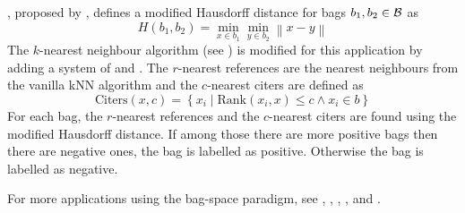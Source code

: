 , proposed by \cite{wang_solving_2000}, defines a modified Hausdorff distance for bags \( b_1, b_2 \in \mathcal{B} \) as
\[ H \left( b_1, b_2 \right) = \min_{x \in b_1} \min_{y \in b_2} \left\lVert x - y \right\rVert \]
The \( k \)-nearest neighbour algorithm (see \cite{dasarathy_nearest_1991}) is modified for this application by adding a system of  and . The \( r \)-nearest references are the nearest neighbours from the vanilla kNN algorithm and the \( c \)-nearest citers are defined as
\[ \mathrm{Citers} \left( x, c \right) = \left\{ x_i \middle| \mathrm{Rank} \left( x_i, x \right) \leq c \wedge x_i \in b \right\} \]
For each bag, the \( r \)-nearest references and the \( c \)-nearest citers are found using the modified Hausdorff distance. If among those there are more positive bags then there are negative ones, the bag is labelled as positive. Otherwise the bag is labelled as negative.

For more applications using the bag-space paradigm, see \cite{wang_solving_2000}, \cite{kwok_marginalized_2007}, \cite{gartner_multi-instance_2002}, \cite{haussler_convolution_1999}, \cite{zhou_multi-instance_2009} and \cite{muandet_learning_2012}.
